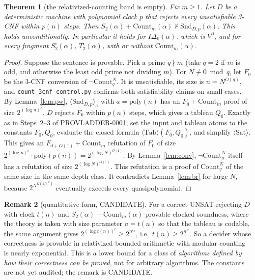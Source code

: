 \documentclass[11pt]{article}
\newtheorem{theorem}{Theorem}
\theoremstyle{definition}
\newtheorem{remark}[theorem]{Remark}
\newcommand{\Snd}{\mathrm{Snd}}
\newcommand{\Count}{\mathrm{Count}}
\begin{document}
\begin{theorem}[the relativized-counting band is empty]\label{thm:band}
Fix $m\ge1$. Let $D$ be a deterministic machine with polynomial clock $p$ that rejects every unsatisfiable 3-CNF within $p(n)$ steps.
Then $S_2(\alpha)+\Count_m(\alpha)\nvdash\Snd_{D,p}(\alpha)$. This holds unconditionally.
In particular it holds for $I\Delta_0(\alpha)$, which is $V^0$, and for every fragment $S^i_2(\alpha)$, $T^i_2(\alpha)$, with or without $\Count_m(\alpha)$.
\end{theorem}
\begin{proof}
Suppose the sentence is provable. Pick a prime $q\nmid m$ (take $q=2$ if $m$ is odd, and otherwise the least odd prime not dividing $m$).
For $N\not\equiv0\bmod q$, let $F_0$ be the 3-CNF conversion of $\neg\Count^N_q$. It is unsatisfiable, its size is $n=N^{O(q)}$,
and \texttt{count\_3cnf\_control.py} confirms both satisfiability claims on small cases.
By Lemma~\ref{lem:pw}, $\langle\Snd_{D,p}\rangle_{a}$ with $a=\mathrm{poly}(n)$ has an $F_d+\Count_m$ proof of size $2^{(\log n)^c}$.
$D$ rejects $F_0$ within $p(n)$ steps, which gives a tableau $Q_0$. Exactly as in Steps~2--3 of PROVLADDER-0001, set the input and tableau
atoms to the constants $F_0,Q_0$, evaluate the closed formula $\langle\mathrm{Tab}\rangle(F_0,Q_0)$, and simplify $\langle\mathrm{Sat}\rangle$.
This gives an $F_{d+O(1)}+\Count_m$ refutation of $F_0$ of size $2^{(\log n)^{c}}\cdot\mathrm{poly}(p(n))=2^{(\log N)^{O(1)}}$.
By Lemma~\ref{lem:conv}, $\neg\Count^N_q$ itself has a refutation of size $2^{(\log N)^{O(1)}}$. This refutation is a proof of $\Count^N_q$ of
the same size in the same depth class. It contradicts Lemma~\ref{lem:br} for large $N$, because $2^{N^{\Omega(1/4^{d'})}}$ eventually exceeds
every quasipolynomial.
\end{proof}

\begin{remark}[quantitative form, CANDIDATE]
For a correct UNSAT-rejecting $D$ with clock $t(n)$ and $S_2(\alpha)+\Count_m(\alpha)$-provable clocked soundness, where the theory is taken
with size parameter $a=t(n)$ so that the tableau is codable, the same argument gives $2^{(\log t(n))^{c}}\ge 2^{n^{\varepsilon_d}}$, i.e.\
$t(n)\ge 2^{n^{\varepsilon'}}$. So a decider whose correctness is provable in relativized bounded arithmetic with modular counting
is nearly exponential. This is a lower bound for a class of \emph{algorithms defined by how their correctness can be proved}, not for arbitrary algorithms.
The constants are not yet audited; the remark is CANDIDATE.
\end{remark}
\end{document}
